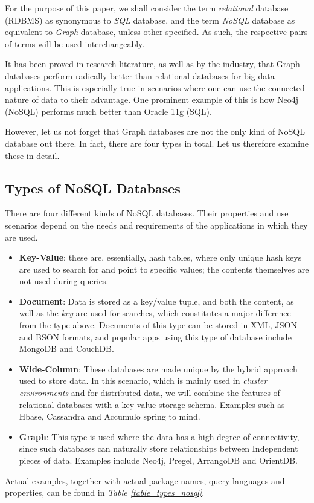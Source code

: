 \documentclass[10pt,        %
               a4paper,     %
               journal,     %
               ]{IEEEtran}
\begin{document}
For the purpose of this paper, we shall consider the term \textit{relational} database (RDBMS) as synonymous to \textit{SQL} database, and the term \textit{NoSQL} database as equivalent to \textit{Graph} database, unless other specified. As such, the respective pairs of terms will be used interchangeably. \par
It has been proved in research literature, as well as by the industry, that Graph databases perform radically better than relational databases for big data applications. \cite{IEEEpaper1:comparison} This is especially true in scenarios where one can use the connected nature of data to their advantage. One prominent example of this is how Neo4j (NoSQL) performs much better than Oracle 11g (SQL). \cite{comparison_2015} \par
However, let us not forget that Graph databases are not the only kind of NoSQL database out there. In fact, there are four types in total. Let us therefore examine these in detail.
\subsection{Types of NoSQL Databases}
There are four different kinds of NoSQL databases. Their properties and use scenarios depend on the needs and requirements of the applications in which they are used. 
\begin{itemize}
	\item \textbf{Key-Value}: these are, essentially, hash tables, where only unique hash keys are used to search for and point to specific values; the contents themselves are not used during queries.
	\item \textbf{Document}: Data is stored as a key/value tuple, and both the content, as well as the \textit{key} are used for searches, which constitutes a major difference from the type above. Documents of this type can be stored in XML, JSON and BSON formats, and popular apps using this type of database include MongoDB and CouchDB.
	\item \textbf{Wide-Column}: These databases are made unique by the hybrid approach used to store data. In this scenario, which is mainly used in \textit{cluster environments} and for distributed data, we will combine the features of relational databases with a key-value storage schema. Examples such as Hbase, Cassandra and Accumulo spring to mind.
	\item \textbf{Graph}: This type is used where the data has a high degree of connectivity, since such databases can naturally store relationships between Independent pieces of data. Examples include Neo4j, Pregel, ArrangoDB and OrientDB. 
\end{itemize}
Actual examples, together with actual package names, query languages and properties, can be found in \textit{Table \ref{table_types_nosql}}. \cite{IEEEpaper1:comparison}
\end{document}
